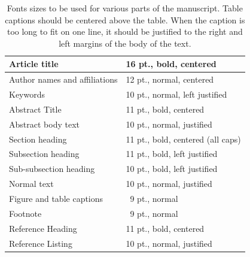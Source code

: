 \documentclass[]{spie}  %
\begin{document}
\begin{table}[ht]
\caption{Fonts sizes to be used for various parts of the manuscript.  Table captions should be centered above the table.  When the caption is too long to fit on one line, it should be justified to the right and left margins of the body of the text.} 
\label{tab:fonts}
\begin{center}       
\begin{tabular}{|l|l|} %
\hline
\rule[-1ex]{0pt}{3.5ex}  Article title & 16 pt., bold, centered  \\
\hline
\rule[-1ex]{0pt}{3.5ex}  Author names and affiliations & 12 pt., normal, centered   \\
\hline
\rule[-1ex]{0pt}{3.5ex}  Keywords & 10 pt., normal, left justified   \\
\hline
\rule[-1ex]{0pt}{3.5ex}  Abstract Title & 11 pt., bold, centered   \\
\hline
\rule[-1ex]{0pt}{3.5ex}  Abstract body text & 10 pt., normal, justified   \\
\hline
\rule[-1ex]{0pt}{3.5ex}  Section heading & 11 pt., bold, centered (all caps)  \\
\hline
\rule[-1ex]{0pt}{3.5ex}  Subsection heading & 11 pt., bold, left justified  \\
\hline
\rule[-1ex]{0pt}{3.5ex}  Sub-subsection heading & 10 pt., bold, left justified  \\
\hline
\rule[-1ex]{0pt}{3.5ex}  Normal text & 10 pt., normal, justified  \\
\hline
\rule[-1ex]{0pt}{3.5ex}  Figure and table captions & \, 9 pt., normal \\
\hline
\rule[-1ex]{0pt}{3.5ex}  Footnote & \, 9 pt., normal \\
\hline 
\rule[-1ex]{0pt}{3.5ex}  Reference Heading & 11 pt., bold, centered   \\
\hline
\rule[-1ex]{0pt}{3.5ex}  Reference Listing & 10 pt., normal, justified   \\
\hline
\end{tabular}
\end{center}
\end{table} 
\end{document}
